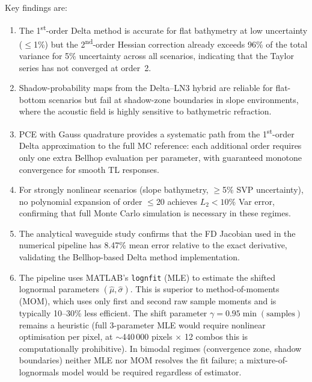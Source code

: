 \documentclass[11pt,a4paper]{article}
\begin{document}
Key findings are:
\begin{enumerate}
  \item The 1\textsuperscript{st}-order Delta method is accurate for flat bathymetry
        at low uncertainty ($\leq$1\%) but the 2\textsuperscript{nd}-order Hessian
        correction already exceeds 96\% of the total variance for 5\% uncertainty
        across all scenarios, indicating that the Taylor series has not converged
        at order~2.
  \item Shadow-probability maps from the Delta--LN3 hybrid are reliable for flat-bottom
        scenarios but fail at shadow-zone boundaries in slope environments, where
        the acoustic field is highly sensitive to bathymetric refraction.
  \item PCE with Gauss quadrature provides a systematic path from the 1\textsuperscript{st}-order
        Delta approximation to the full MC reference: each additional order requires
        only one extra Bellhop evaluation per parameter, with guaranteed monotone
        convergence for smooth TL responses.
  \item For strongly nonlinear scenarios (slope bathymetry, $\geq$5\% SVP uncertainty),
        no polynomial expansion of order $\leq$20 achieves $L_2 < 10\%$ Var error, confirming
        that full Monte Carlo simulation is necessary in these regimes.
  \item The analytical waveguide study confirms that the FD Jacobian used in the
        numerical pipeline has 8.47\% mean error relative to the exact derivative,
        validating the Bellhop-based Delta method implementation.
  \item The pipeline uses MATLAB's \texttt{lognfit} (MLE) to estimate the shifted
        lognormal parameters $(\hat\mu, \hat\sigma)$.  This is superior to
        method-of-moments (MOM), which uses only first and second raw sample moments
        and is typically 10--30\% less efficient.
        The shift parameter $\gamma = 0.95\min(\mathrm{samples})$ remains a heuristic
        (full 3-parameter MLE would require nonlinear optimisation per pixel, at
        $\sim$440\,000 pixels $\times$ 12 combos this is computationally prohibitive).
        In bimodal regimes (convergence zone, shadow boundaries) neither MLE nor MOM
        resolves the fit failure; a mixture-of-lognormals model would be required
        regardless of estimator.
\end{enumerate}

\end{document}

